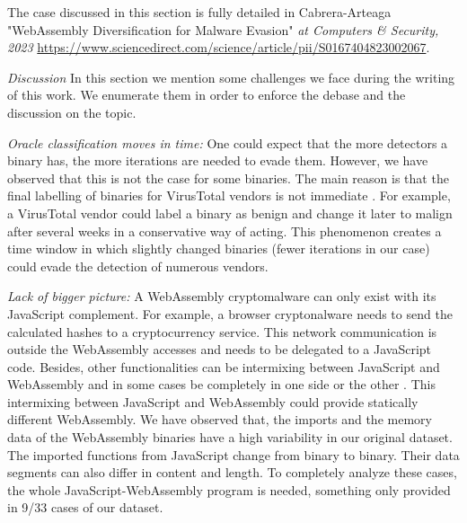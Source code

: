 





\begin{tcolorbox}[title=Contribution paper,boxrule=1pt,arc=.2em,boxsep=1.0mm]
    The case discussed in this section is fully detailed in Cabrera-Arteaga \etal "WebAssembly Diversification for Malware Evasion"
    \emph{at Computers \& Security, 2023}
    \url{https://www.sciencedirect.com/science/article/pii/S0167404823002067}. 
\end{tcolorbox}


\emph{Discussion}
In this section we mention some challenges we face during the writing of this work.
We enumerate them in order to enforce the debase and the discussion on the topic.

\emph{Oracle classification moves in time:}
One could expect that the more detectors a binary has, the more iterations are needed to evade them.
However, we have observed that this is not the case for some binaries.
The main reason is that the final labelling of binaries for VirusTotal vendors is not immediate \cite{251586}. 
For example, a VirusTotal vendor could label a binary as benign and change it later to malign after several weeks in a conservative way of acting.
This phenomenon creates a time window in which slightly changed binaries (fewer iterations in our case) could evade the detection of numerous vendors.

\emph{Lack of bigger picture:} A WebAssembly cryptomalware can only exist with its JavaScript complement.
For example, a browser cryptonalware needs to send the calculated hashes to a cryptocurrency service.
This network communication is outside the WebAssembly accesses and needs to be delegated to a JavaScript code.
Besides, other functionalities can be intermixing between JavaScript and WebAssembly and in some cases be completely in one side or the other \cite{romano2022wobfuscator}.
This intermixing between JavaScript and WebAssembly could provide statically different WebAssembly. 
We have observed that, the imports and the memory data of the WebAssembly binaries have a high variability in our original dataset.
The imported functions from JavaScript change from binary to binary.
Their data segments can also differ in content and length.
To completely analyze these cases, the whole JavaScript-WebAssembly program is needed, something only provided in 9/33 cases of our dataset.

